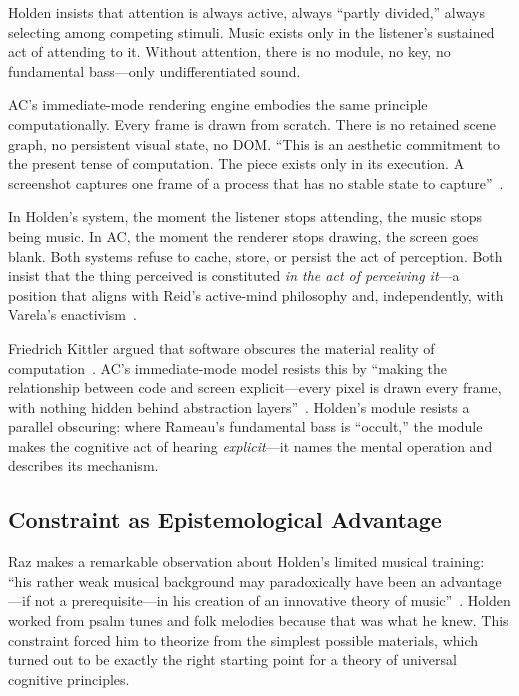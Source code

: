\documentclass[10pt,letterpaper,twocolumn]{article}
\begin{document}
Holden insists that attention is always active, always ``partly divided,'' always selecting among competing stimuli. Music exists only in the listener's sustained act of attending to it. Without attention, there is no module, no key, no fundamental bass---only undifferentiated sound.

AC's immediate-mode rendering engine embodies the same principle computationally. Every frame is drawn from scratch. There is no retained scene graph, no persistent visual state, no DOM. ``This is an aesthetic commitment to the present tense of computation. The piece exists only in its execution. A screenshot captures one frame of a process that has no stable state to capture''~\citep{acgoodiepal2026}.

In Holden's system, the moment the listener stops attending, the music stops being music. In AC, the moment the renderer stops drawing, the screen goes blank. Both systems refuse to cache, store, or persist the act of perception. Both insist that the thing perceived is constituted \emph{in the act of perceiving it}---a position that aligns with Reid's active-mind philosophy and, independently, with Varela's enactivism~\citep{varela1991}.

Friedrich Kittler argued that software obscures the material reality of computation~\citep{kittler1999}. AC's immediate-mode model resists this by ``making the relationship between code and screen explicit---every pixel is drawn every frame, with nothing hidden behind abstraction layers''~\citep{acmain2026}. Holden's module resists a parallel obscuring: where Rameau's fundamental bass is ``occult,'' the module makes the cognitive act of hearing \emph{explicit}---it names the mental operation and describes its mechanism.

\subsection{Constraint as Epistemological Advantage}

Raz makes a remarkable observation about Holden's limited musical training: ``his rather weak musical background may paradoxically have been an advantage---if not a prerequisite---in his creation of an innovative theory of music''~\citep{raz2025}. Holden worked from psalm tunes and folk melodies because that was what he knew. This constraint forced him to theorize from the simplest possible materials, which turned out to be exactly the right starting point for a theory of universal cognitive principles.
\end{document}
